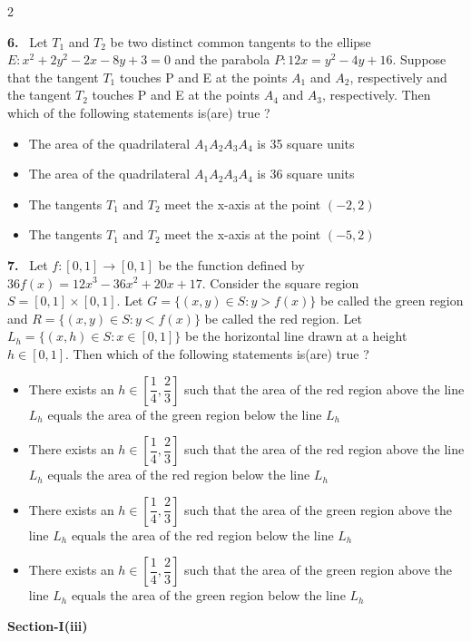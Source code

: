 \documentclass[10pt]{extarticle}
\newcommand{\sect}[1]{\par\smallskip\noindent\textbf{#1}\par}
\newcommand{\qn}[1]{\par\smallskip\noindent\textbf{#1.}~}
\newenvironment{qoptions}{\begin{itemize}[leftmargin=1.8em,itemsep=1pt,topsep=2pt,label={}]}{\end{itemize}}
\newcommand{\opt}[2]{\item[(#1)] #2}
\begin{document}
\begin{multicols}{2}
\qn{6} Let $T_1$ and $T_2$ be two distinct common tangents to the ellipse $E:x^2+2y^2-2x-8y+3=0$ and the parabola $P:12x=y^2-4y+16$. Suppose that the tangent $T_1$ touches P and E at the points $A_1$ and $A_2$, respectively and the tangent $T_2$ touches P and E at the points $A_4$ and $A_3$, respectively. Then which of the following statements is(are) true ?
\begin{qoptions}
\opt{A}{The area of the quadrilateral $A_1A_2A_3A_4$ is 35 square units}
\opt{B}{The area of the quadrilateral $A_1A_2A_3A_4$ is 36 square units}
\opt{C}{The tangents $T_1$ and $T_2$ meet the x-axis at the point $(-2,2)$}
\opt{D}{The tangents $T_1$ and $T_2$ meet the x-axis at the point $(-5,2)$}
\end{qoptions}

\qn{7} Let $f:[0,1]\to[0,1]$ be the function defined by $36f(x)=12x^3-36x^2+20x+17$. Consider the square region $S=[0,1]\times[0,1]$. Let $G=\{(x,y)\in S:y>f(x)\}$ be called the green region and $R=\{(x,y)\in S:y<f(x)\}$ be called the red region. Let $L_h=\{(x,h)\in S:x\in[0,1]\}$ be the horizontal line drawn at a height $h\in[0,1]$. Then which of the following statements is(are) true ?
\begin{qoptions}
\opt{A}{There exists an $h\in\left[\dfrac14,\dfrac23\right]$ such that the area of the red region above the line $L_h$ equals the area of the green region below the line $L_h$}
\opt{B}{There exists an $h\in\left[\dfrac14,\dfrac23\right]$ such that the area of the red region above the line $L_h$ equals the area of the red region below the line $L_h$}
\opt{C}{There exists an $h\in\left[\dfrac14,\dfrac23\right]$ such that the area of the green region above the line $L_h$ equals the area of the red region below the line $L_h$}
\opt{D}{There exists an $h\in\left[\dfrac14,\dfrac23\right]$ such that the area of the green region above the line $L_h$ equals the area of the green region below the line $L_h$}
\end{qoptions}

\sect{Section-I(iii)}


\end{multicols}
\end{document}
